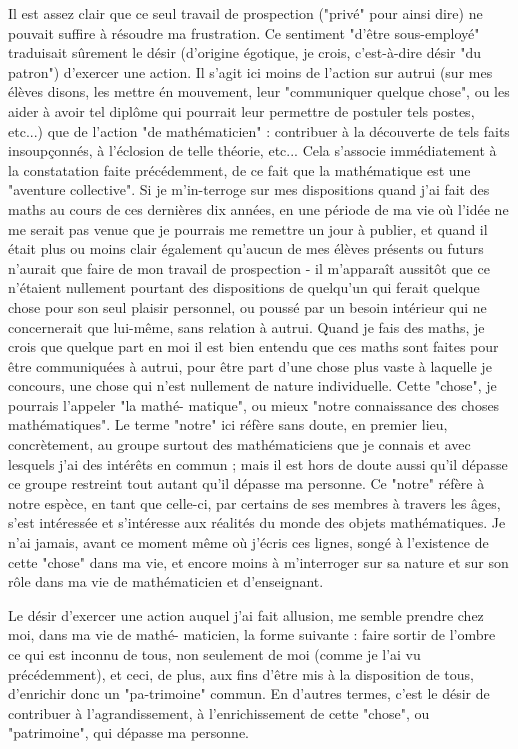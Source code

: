 Il est assez clair que ce seul travail de prospection ("privé" pour ainsi dire) ne pouvait suffire à résoudre ma frustration. Ce sentiment "d'être sous-employé" traduisait sûrement le désir (d'origine égotique, je crois, c'est-à-dire désir "du patron") d'exercer une action. Il s'agit ici moins de l'action sur autrui (sur mes élèves disons, les mettre én mouvement, leur "communiquer quelque chose", ou les aider à avoir tel diplôme qui pourrait leur permettre de postuler tels postes, etc...) que de l'action "de mathématicien" : contribuer à la découverte de tels faits insoupçonnés, à l'éclosion de telle théorie, etc... Cela s'associe immédiatement à la constatation faite précédemment, de ce fait que la mathématique est une "aventure collective". Si je m'in-terroge sur mes dispositions quand j'ai fait des maths au cours de ces dernières dix années, en une période de ma vie où l'idée ne me serait pas venue que je pourrais me remettre un jour à publier, et quand il était plus ou moins clair également qu'aucun de mes élèves présents ou futurs n'aurait que faire de mon travail de prospection - il m'apparaît aussitôt que ce n'étaient nullement pourtant des dispositions de quelqu'un qui ferait quelque chose pour son seul plaisir personnel, ou poussé par un besoin intérieur qui ne concernerait que lui-même, sans relation à autrui. Quand je fais des maths, je crois que quelque part en moi il est bien entendu que ces maths sont faites pour être communiquées à autrui, pour être part d'une chose plus vaste à laquelle je concours, une chose qui n'est nullement de nature individuelle. Cette "chose", je pourrais l'appeler "la mathé- matique", ou mieux "notre connaissance des choses mathématiques". Le terme "notre" ici réfère sans doute, en premier lieu, concrètement, au groupe surtout des mathématiciens que je connais et avec lesquels j’ai des intérêts en commun ; mais il est hors de doute aussi qu'il dépasse ce groupe restreint tout autant qu'il dépasse ma personne. Ce "notre" réfère à notre espèce, en tant que celle-ci, par certains de ses membres à travers les âges, s'est intéressée et s'intéresse aux réalités du monde des objets mathématiques. Je n'ai jamais, avant ce moment même où j’écris ces lignes, songé à l’existence de cette "chose" dans ma vie, et encore moins à m'interroger sur sa nature et sur son rôle dans ma vie de mathématicien et d'enseignant.

Le désir d'exercer une action auquel j'ai fait allusion, me semble prendre chez moi, dans ma vie de mathé- maticien, la forme suivante : faire sortir de l'ombre ce qui est inconnu de tous, non seulement de moi (comme je l'ai vu précédemment), et ceci, de plus, aux fins d'être mis à la disposition de tous, d'enrichir donc un "pa-trimoine" commun. En d'autres termes, c'est le désir de contribuer à l'agrandissement, à l'enrichissement de cette "chose", ou "patrimoine", qui dépasse ma personne.

